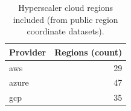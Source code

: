 \begin{table}[ht]
\centering
\begin{tabular}{lr}
\toprule
Provider & Regions (count) \\
\midrule
aws & 29 \\
azure & 47 \\
gcp & 35 \\
\bottomrule
\end{tabular}
\caption{Hyperscaler cloud regions included (from public region coordinate datasets).}
\label{tab:region_counts}
\end{table}
